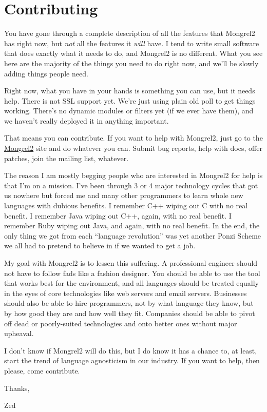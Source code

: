 \chapter{Contributing}

You have gone through a complete description of all the features that Mongrel2 has right now,
but \emph{not} all the features it \emph{will} have.  I tend to write small software that does
exactly what it needs to do, and Mongrel2 is no different.  What you see here are the
majority of the things you need to do right now, and we'll be slowly adding things
people need.

Right now, what you have in your hands is something you can use, but it needs help.
There is not SSL support yet.  We're just using plain old poll to get things working.
There's no dynamic modules or filters yet (if we ever have them), and we haven't
really deployed it in anything important.

That means you can contribute.  If you want to help with Mongrel2, just go to
the \href{http://mongrel2.org}{Mongrel2} site and do whatever you can.  Submit bug
reports, help with docs, offer patches, join the mailing list, whatever.

The reason I am mostly begging people who are interested in Mongrel2 for help is that I'm
on a mission.  I've been through 3 or 4 major technology cycles that got us nowhere
but forced me and many other programmers to learn whole new languages with dubious
benefits.  I remember C++ wiping out C with no real benefit.  I remember Java wiping
out C++, again, with no real benefit.  I remember Ruby wiping out Java, and again, with no
real benefit.  In the end, the only thing we got from each ``language revolution'' was
yet another Ponzi Scheme we all had to pretend to believe in if we wanted to get a
job.

My goal with Mongrel2 is to lessen this suffering.  A professional engineer should not
have to follow fads like a fashion designer.  You should be able to use the tool that
works best for the environment, and all languages should be treated equally in the eyes
of core technologies like web servers and email servers.  Businesses should also be
able to hire programmers, not by what language they know, but by how good they are and
how well they fit.  Companies should be able to pivot off dead or poorly-suited
technologies and onto better ones without major upheaval.

I don't know if Mongrel2 will do this, but I do know it has a chance to, at least, start
the trend of language agnosticism in our industry.  If you want to help, then please,
come contribute.

Thanks,

\indent Zed
